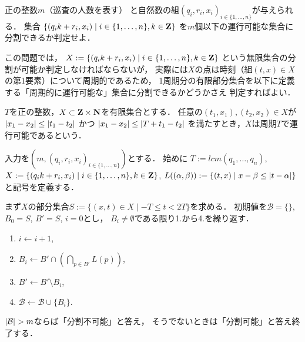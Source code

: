 \begin{timeSpecifiedProblemOnLine}
  正の整数$m$（巡査の人数を表す）
  と自然数の組$(q_i, r_i, x_i)_{ i \in \{ 1, \ldots, n \} }$が与えられる．
  集合
  $\{ (q_i k + r_i, x_i) \mid i \in \{1, \ldots, n\}, k \in \mathbf Z \}$
  を$m$個以下の運行可能な集合に分割できるか判定せよ．
\end{timeSpecifiedProblemOnLine}



この問題では，
$X := \{ (q_i k + r_i, x_i) \mid i \in \{1, \ldots, n\}, k \in \mathbf Z \}$
という無限集合の分割が可能か判定しなければならないが，
実際には$X$の点は時刻（組$(t, x) \in X$の第1要素）について周期的であるため，
1周期分の有限部分集合を以下に定義する「周期的に運行可能な」集合に分割できるかどうかさえ
判定すればよい．




\begin{defi}
  $T$を正の整数，$X \subset \mathbf Z \times \mathbf N$を有限集合とする．
  任意の$(t_1, x_1), (t_2, x_2) \in X$が
  $\lvert{x_1 - x_2}\rvert \leq \lvert{t_1 - t_2}\rvert$
  かつ
  $\lvert{x_1 - x_2}\rvert \leq \lvert{T + t_1 - t_2}\rvert$
  を満たすとき，$X$は周期$T$で運行可能であるという．
\end{defi}



\begin{greedyAlgorithmForTimeSpecifiedProblemOnLine}
  入力を$(m, (q_i, r_i, x_i)_{ i \in \{ 1, \ldots, n \} })$とする．
  始めに
  $T := lcm(q_1, \ldots, q_n)$,
  $X := \{ (q_i k + r_i, x_i) \mid i \in \{1, \ldots, n\}, k \in \mathbf Z \}$,
  $L((\alpha, \beta)) := \{(t, x) \mid x - \beta \leq \lvert{t - \alpha}\rvert \}$と記号を定義する．

  まず$X$の部分集合$S := \{ (x, t) \in X \mid -T \leq t < 2T \}$を求める．
  初期値を$\mathcal{B} = \{\}$, $B_0 = S$, $B' = S$, $i = 0$とし，
  $B_i \neq \emptyset$である限り1.から4.を繰り返す．
  \begin{enumerate}
    \item $i \gets i + 1$, 
    \item $B_i \gets B' \cap \left( \bigcap_{p \in B'} L(p) \right)$, 
    \item $B' \gets B' \setminus B_i$, 
    \item $\mathcal{B} \gets \mathcal{B} \cup \{ B_i \}$.
  \end{enumerate}

  $\lvert{\mathcal{B}}\rvert > m$ならば「分割不可能」と答え，
  そうでないときは「分割可能」と答え終了する．
\end{greedyAlgorithmForTimeSpecifiedProblemOnLine}

